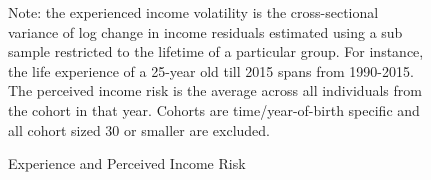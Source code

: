     
 \newpage
 
\begin{figure}[!ht]
	\caption{Experience and Perceived Income Risk}
	\label{fig:var_experience_data}
	\begin{center}
\end{center}
\begin{flushleft}Note: the experienced income volatility is the cross-sectional variance of log change in income residuals estimated using a sub sample restricted to the lifetime of a particular group. For instance, the life experience of a 25-year old till 2015 spans from 1990-2015. The perceived income risk is the average across all individuals from the cohort in that year. Cohorts are time/year-of-birth specific and all cohort sized 30 or smaller are excluded.\end{flushleft}
\end{figure}



 \newpage
 
